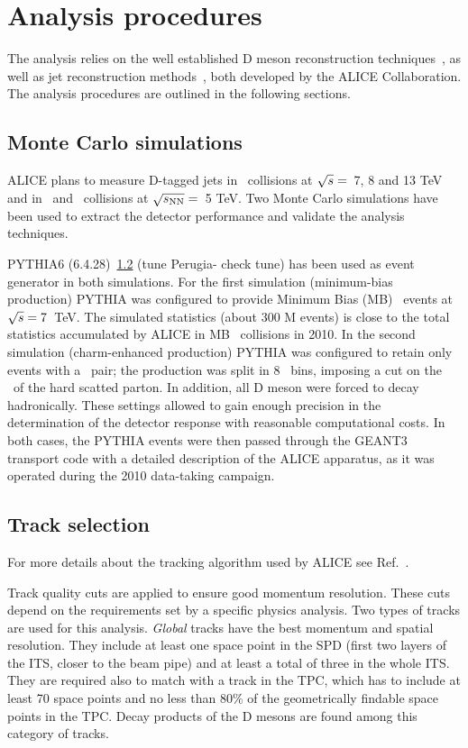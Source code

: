 \documentclass[a4paper]{jpconf}
\begin{document}
\section{Analysis procedures}
The analysis relies on the well established D meson reconstruction techniques~\cite{ALICE:2012d, ALICE:2012e, ALICE:2014d, ALICE:2015c, ALICE:2015d, ALICE:2016a}, as well as
jet reconstruction methods~\cite{ALICE:2013c, ALICE:2014a, ALICE:2015e, ALICE:2015f}, both developed by the ALICE Collaboration. The analysis procedures are outlined in the following sections.

\subsection{Monte Carlo simulations}
ALICE plans to measure D-tagged jets in \pp\ collisions at $\sqrt{s}=$~7, 8 and 13 TeV and in \pPb\ and \PbPb\ collisions at $\sqrt{s_{\rm NN}}=$~5 TeV.
Two Monte Carlo simulations have been used to extract the detector performance and validate the analysis techniques.

PYTHIA6 (6.4.28)~\ref{} (tune Perugia-{\color{red} check tune}) has been used as event generator in both simulations.
For the first simulation (minimum-bias production) PYTHIA was configured to provide Minimum Bias (MB) \pp\ events at $\sqrt{s}=7$~TeV.
The simulated statistics (about 300 M events) is close to the total statistics accumulated by ALICE in MB \pp\ collisions
in 2010. In the second simulation (charm-enhanced production) PYTHIA was configured to retain only events with a \ccbar\ pair; the production
was split in 8 \pthard\ bins, imposing a cut on the \pT\ of the hard scatted parton. In addition, all D meson were forced
to decay hadronically. These settings allowed to gain enough precision in the determination of the detector response with reasonable
computational costs.
In both cases, the PYTHIA events were then passed through the GEANT3 transport code with a detailed description of the ALICE apparatus,
as it was operated during the 2010 data-taking campaign.

\subsection{Track selection}
For more details about the tracking algorithm used by ALICE see Ref.~\cite{ALICE:2014b}.

Track quality cuts are applied to ensure good momentum resolution. These cuts
depend on the requirements set by a specific physics analysis.
Two types of tracks are used for this analysis. \emph{Global} tracks have the best
momentum and spatial resolution. They include at least one space point in the SPD (first two
layers of the ITS, closer to the beam pipe) and at least a total of three in the whole ITS. They are required also to
match with a track in the TPC, which has to include at least 70 space points and no less than 80\% of the geometrically findable 
space points in the TPC. Decay products of the D mesons are found among this category of tracks.
\end{document}
